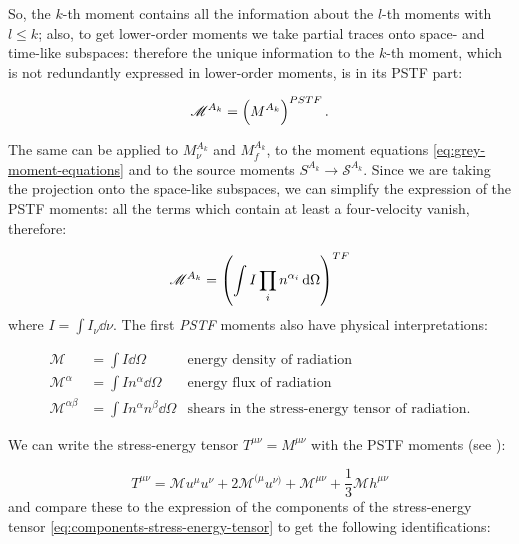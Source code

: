 \documentclass[main.tex]{subfiles}
\begin{document}
So, the \(k\)-th moment contains all the information about the \(l\)-th moments with \(l\leq k\); also, to get lower-order moments we take partial traces onto space- and time-like subspaces: therefore the unique information to the \(k\)-th moment, which is not redundantly expressed in lower-order moments, is in its PSTF part:

\begin{equation}
  \mathscr M ^{A_k} = \qty(M^{A_k}) ^{PSTF} \,.
\end{equation}

The same can be applied to \(M^{A_k}_\nu\) and \(M^{A_k}_f\), to the moment equations \eqref{eq:grey-moment-equations} and to the source moments \(S^{A_k} \rightarrow \mathscr S ^{A_k}\). Since we are taking the projection onto the space-like subspaces, we can simplify the expression of the PSTF moments: all the terms which contain at least a four-velocity vanish, therefore:

\begin{equation} \label{eq:trace-free-moments-definition}
  \mathscr M^{A_k} = \qty(\int I \prod_i n^{\alpha_i} \dd{\Omega})^{TF}
\end{equation}
where \(I = \int I_\nu \dd{\nu}\).
The first \emph{PSTF} moments also have physical interpretations:

\begin{subequations}
\begin{align}
   \mathscr M &= \int  I \dd{\Omega}    & \text{energy density of radiation}  \\
   \mathscr M^\alpha &= \int I n^\alpha\dd{\Omega}  & \text{energy flux of radiation}  \\
   \mathscr M^{\alpha\beta} &= \int I n^\alpha n^\beta \dd{\Omega}   & \text{shears in the stress-energy tensor of radiation.}
\end{align}
\end{subequations}

We can write the stress-energy tensor \(T^{\mu\nu} = M^{\mu\nu}\) with the PSTF moments (see \cite[eq. 4.9]{Thorne:1981feb}):

\begin{equation} \label{eq:PSTF-stress-energy-tensor-decomposition}
    T^{\mu\nu} = \mathscr M u^\mu u^\nu + 2 \mathscr M ^{(\mu} u^{\nu)}
    + \mathscr M ^{\mu\nu} + \frac{1}{3} \mathscr M h^{\mu\nu}
\end{equation}
and compare these to the expression of the components of the stress-energy tensor \eqref{eq:components-stress-energy-tensor} to get the following identifications:
\end{document}

